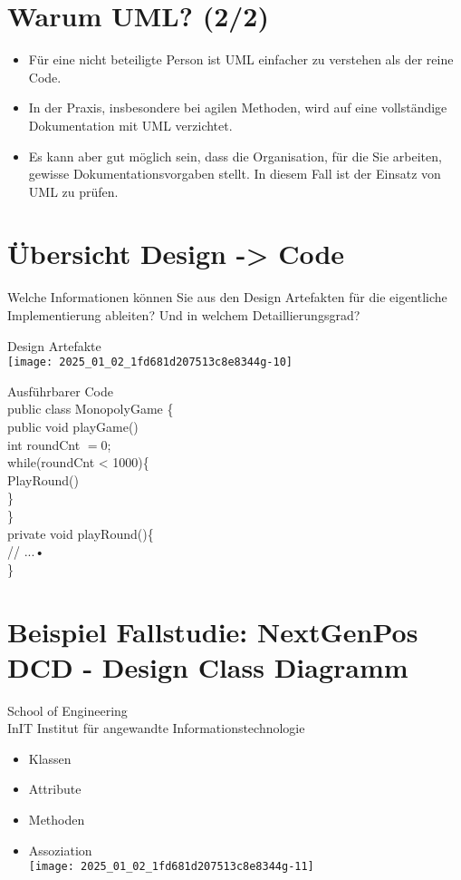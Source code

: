 \documentclass[10pt]{article}
\begin{document}
\section*{Warum UML? (2/2)}
\begin{itemize}
  \item Für eine nicht beteiligte Person ist UML einfacher zu verstehen als der reine Code.
  \item In der Praxis, insbesondere bei agilen Methoden, wird auf eine vollständige Dokumentation mit UML verzichtet.
  \item Es kann aber gut möglich sein, dass die Organisation, für die Sie arbeiten, gewisse Dokumentationsvorgaben stellt. In diesem Fall ist der Einsatz von UML zu prüfen.
\end{itemize}

\section*{Übersicht Design -> Code}
Welche Informationen können Sie aus den Design Artefakten für die eigentliche Implementierung ableiten? Und in welchem Detaillierungsgrad?

Design Artefakte\\
\texttt{[image: 2025\_01\_02\_1fd681d207513c8e8344g-10]}

Ausführbarer Code\\
public class MonopolyGame \{\\
public void playGame()\\
int roundCnt $=0$;\\
while(roundCnt < 1000)\{\\
PlayRound()\\
\}\\
\}\\
private void playRound()\{\\
// ...•\\
\}

\section*{Beispiel Fallstudie: NextGenPos DCD - Design Class Diagramm}
School of Engineering\\
InIT Institut für angewandte Informationstechnologie

\begin{itemize}
  \item Klassen
  \item Attribute
  \item Methoden
  \item Assoziation\\
\texttt{[image: 2025\_01\_02\_1fd681d207513c8e8344g-11]}
\end{itemize}
\end{document}
